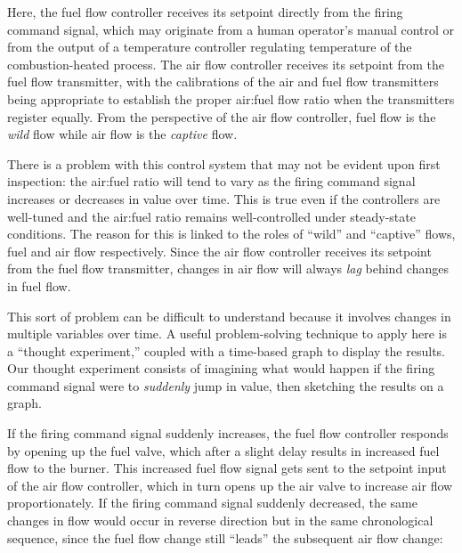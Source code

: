 Here, the fuel flow controller receives its setpoint directly from the firing command signal, which may originate from a human operator's manual control or from the output of a temperature controller regulating temperature of the combustion-heated process.  The air flow controller receives its setpoint from the fuel flow transmitter, with the calibrations of the air and fuel flow transmitters being appropriate to establish the proper air:fuel flow ratio when the transmitters register equally.  From the perspective of the air flow controller, fuel flow is the \textit{wild} flow while air flow is the \textit{captive} flow.    

There is a problem with this control system that may not be evident upon first inspection: the air:fuel ratio will tend to vary as the firing command signal increases or decreases in value over time.  This is true even if the controllers are well-tuned and the air:fuel ratio remains well-controlled under steady-state conditions.  The reason for this is linked to the roles of ``wild'' and ``captive'' flows, fuel and air flow respectively.  Since the air flow controller receives its setpoint from the fuel flow transmitter, changes in air flow will always \textit{lag} behind changes in fuel flow.  

This sort of problem can be difficult to understand because it involves changes in multiple variables over time.  A useful problem-solving technique to apply here is a ``thought experiment,'' coupled with a time-based graph to display the results.  Our thought experiment consists of imagining what would happen if the firing command signal were to \textit{suddenly} jump in value, then sketching the results on a graph.

\filbreak

If the firing command signal suddenly increases, the fuel flow controller responds by opening up the fuel valve, which after a slight delay results in increased fuel flow to the burner.  This increased fuel flow signal gets sent to the setpoint input of the air flow controller, which in turn opens up the air valve to increase air flow proportionately.  If the firing command signal suddenly decreased, the same changes in flow would occur in reverse direction but in the same chronological sequence, since the fuel flow change still ``leads'' the subsequent air flow change:    

